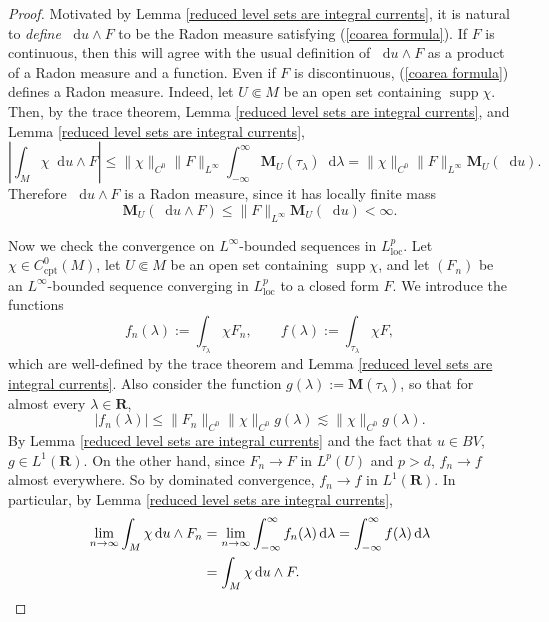 \documentclass[reqno,11pt]{amsart}
\newcommand{\RR}{\mathbf{R}}
\newcommand*\dif{\mathop{}\!\mathrm{d}}
\DeclareMathOperator{\supp}{supp}
\newcommand{\Mass}{\mathbf M}
\newcommand{\loc}{\mathrm{loc}}
\newcommand{\cpt}{\mathrm{cpt}}
\theoremstyle{definition}
\numberwithin{equation}{section}
\begin{document}
\begin{proof}
Motivated by Lemma \ref{reduced level sets are integral currents}, it is natural to \emph{define} $\dif u \wedge F$ to be the Radon measure satisfying (\ref{coarea formula}).
If $F$ is continuous, then this will agree with the usual definition of $\dif u \wedge F$ as a product of a Radon measure and a function.
Even if $F$ is discontinuous, (\ref{coarea formula}) defines a Radon measure.
Indeed, let $U \Subset M$ be an open set containing $\supp \chi$.
Then, by the trace theorem, Lemma \ref{reduced level sets are integral currents}, and Lemma \ref{reduced level sets are integral currents},
$$\left|\int_M \chi \dif u \wedge F\right| \leq \|\chi\|_{C^0} \|F\|_{L^\infty} \int_{-\infty}^\infty \Mass_U(\tau_\lambda) \dif \lambda = \|\chi\|_{C^0} \|F\|_{L^\infty} \Mass_U(\dif u).$$
Therefore $\dif u \wedge F$ is a Radon measure, since it has locally finite mass
$$\Mass_U(\dif u \wedge F) \leq \|F\|_{L^\infty} \Mass_U(\dif u) < \infty.$$

Now we check the convergence on $L^\infty$-bounded sequences in $L^p_\loc$.
Let $\chi \in C^0_\cpt(M)$, let $U \Subset M$ be an open set containing $\supp \chi$, and let $(F_n)$ be an $L^\infty$-bounded sequence converging in $L^p_\loc$ to a closed form $F$.
We introduce the functions
$$f_n(\lambda) := \int_{\tau_\lambda} \chi F_n, \qquad f(\lambda) := \int_{\tau_\lambda} \chi F,$$
which are well-defined by the trace theorem and Lemma \ref{reduced level sets are integral currents}.
Also consider the function $g(\lambda) := \Mass(\tau_\lambda)$, so that for almost every $\lambda \in \RR$, 
$$|f_n(\lambda)| \leq \|F_n\|_{C^0} \|\chi\|_{C^0} g(\lambda) \lesssim \|\chi\|_{C^0} g(\lambda).$$
By Lemma \ref{reduced level sets are integral currents} and the fact that $u \in BV$, $g \in L^1(\RR)$.
On the other hand, since $F_n \to F$ in $L^p(U)$ and $p > d$, $f_n \to f$ almost everywhere.
So by dominated convergence, $f_n \to f$ in $L^1(\RR)$.
In particular, by Lemma \ref{reduced level sets are integral currents},
\begin{align*}
\lim_{n \to \infty} \int_M \chi \dif u \wedge F_n
&= \lim_{n \to \infty} \int_{-\infty}^\infty f_n(\lambda) \dif \lambda
= \int_{-\infty}^\infty f(\lambda) \dif \lambda \\
&= \int_M \chi \dif u \wedge F. \qedhere 
\end{align*}
\end{proof}

\end{document}
